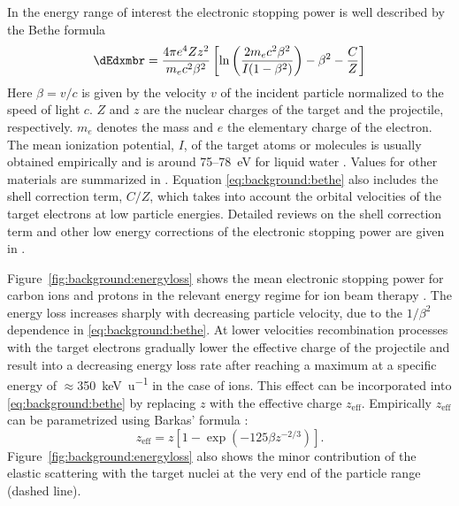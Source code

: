 In the energy range of interest the electronic stopping power is well
described by the Bethe formula
\citep{Bethe1930,Bloch1933,Bloch1933a,Fano1963}
\begin{equation}
  \dEdxmbr=\frac{4\pi
    e^4Zz^2}{m_ec^2\beta^2}\left[\ln{\left(\frac{2m_ec^2\beta^2}{I(1-\beta^2)}\right)}
    -\beta^2-\frac{C}{Z}\right]
  \label{eq:background:bethe}
\end{equation}
Here $\beta=v/c$ is given by the velocity $v$ of the incident particle
normalized to the speed of light $c$. $Z$ and $z$ are the nuclear
charges of the target and the projectile, respectively. $m_e$ denotes
the mass and $e$ the elementary charge of the electron. The mean
ionization potential, $I$, of the target atoms or molecules is usually
obtained empirically and is around \num{75}--\SI{78}{\electronvolt}
for liquid water \citep{Schardt2008,Paul2007,Kumazaki2007}. Values for
other materials are summarized in \citet{ICRU49,ICRU37}. Equation
\eqref{eq:background:bethe} also includes the shell correction term,
$C/Z$, which takes into account the orbital velocities of the target
electrons at low particle energies.
Detailed reviews on the shell correction term and other low energy
corrections of the electronic stopping power are given in
\citep{ICRU49,Ziegler1999}.

Figure~\ref{fig:background:energyloss} shows the mean electronic
stopping power for carbon ions and protons in the relevant energy
regime for ion beam therapy \citep{Schardt2010}. The energy loss
increases sharply with decreasing particle velocity, due to the
$1/\beta^2$ dependence in \eqref{eq:background:bethe}. At lower
velocities recombination processes with the target electrons gradually
lower the effective charge of the projectile and result into a
decreasing energy loss rate after reaching a maximum at a specific
energy of $\approx$\SI{350}{\kilo\electronvolt\per\atomicmassunit} in
the case of \Ctw ions. This effect can be incorporated into
\eqref{eq:background:bethe} by replacing $z$ with the effective
charge $z_\text{eff}$. Empirically $z_\text{eff}$ can be parametrized
using Barkas' formula \citep{Barkas1964}:
\begin{equation}
  z_\text{eff}=z\left[1-\exp(-125\beta z^{-2/3})\right].
\end{equation}
Figure~\ref{fig:background:energyloss} also shows the minor
contribution of the elastic scattering with the target nuclei at the
very end of the particle range (dashed line).

